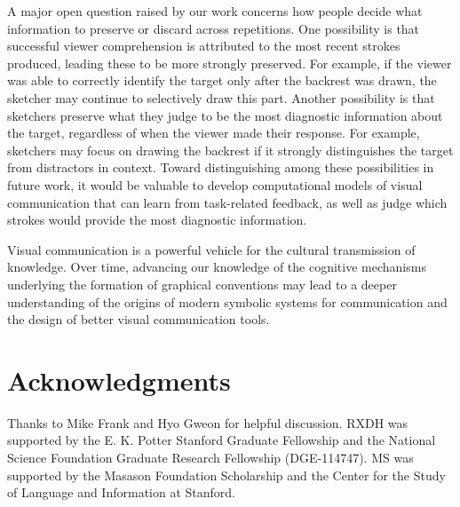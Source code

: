 \documentclass[10pt,letterpaper]{article}
\newcommand{\ndg}[1]{{\textcolor{Green}{[ndg: #1]}}}
\begin{document}
A major open question raised by our work concerns how people decide what information to preserve or discard across repetitions.
One possibility is that successful viewer comprehension is attributed to the most recent strokes produced, leading these to be more strongly preserved.
For example, if the viewer was able to correctly identify the target only after the backrest was drawn, the sketcher may continue to selectively draw this part.
Another possibility is that sketchers preserve what they judge to be the most diagnostic information about the target, regardless of when the viewer made their response.
For example, sketchers may focus on drawing the backrest if it strongly distinguishes the target from distractors in context.
Toward distinguishing among these possibilities in future work, it would be valuable to develop computational models of visual communication that can learn from task-related feedback, as well as judge which strokes would provide the most diagnostic information.

Visual communication is a powerful vehicle for the cultural transmission of knowledge.
Over time, advancing our knowledge of the cognitive mechanisms underlying the formation of graphical conventions may lead to a deeper understanding of the origins of modern symbolic systems for communication and the design of better visual communication tools.

\section{\bf Acknowledgments}
\small
Thanks to Mike Frank and Hyo Gweon for helpful discussion.
RXDH was supported by the E. K. Potter Stanford Graduate Fellowship and the National Science Foundation Graduate Research Fellowship (DGE-114747).
MS was supported by the Masason Foundation Scholarship and the Center for the Study of Language and Information at Stanford. 
\end{document}
